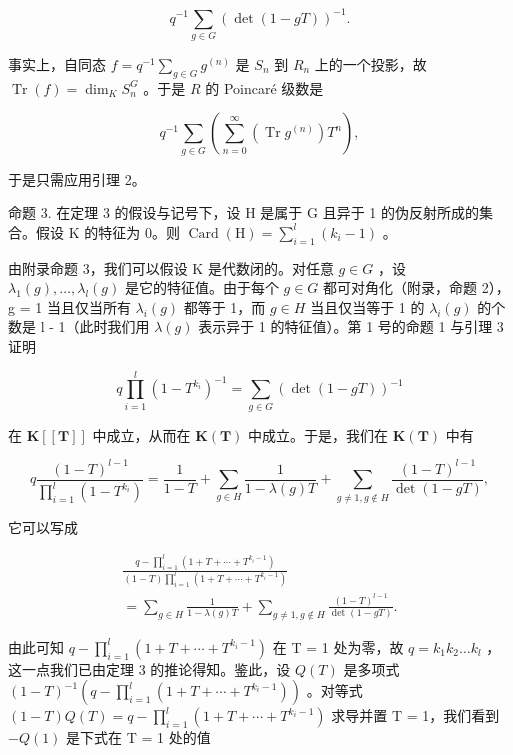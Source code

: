 \[
q ^ {- 1} \sum_ {g \in G} (\det (1 - g T)) ^ {- 1}.
\]

事实上，自同态 \(f = q^{-1} \sum_{g \in G} g^{(n)}\) 是 \(S_n\) 到 \(R_n\) 上的一个投影，故 \(\operatorname{Tr}(f) = \dim_K S_n^G\) 。于是 \(R\) 的 Poincaré 级数是

\[
q ^ {- 1} \sum_ {g \in G} \left(\sum_ {n = 0} ^ {\infty} (\operatorname{Tr} g ^ {(n)}) T ^ {n}\right),
\]

于是只需应用引理 2。

命题 3. 在定理 3 的假设与记号下，设 H 是属于 G 且异于 1 的伪反射所成的集合。假设 K 的特征为 0。则 \(\operatorname{Card}(\mathrm{H}) = \sum_{i=1}^{l}(k_i - 1)\) 。

由附录命题 3，我们可以假设 K 是代数闭的。对任意 \(g \in G\) ，设 \(\lambda_{1}(g), \ldots, \lambda_{l}(g)\) 是它的特征值。由于每个 \(g \in G\) 都可对角化（附录，命题 2），g = 1 当且仅当所有 \(\lambda_{i}(g)\) 都等于 1，而 \(g \in H\) 当且仅当等于 1 的 \(\lambda_{i}(g)\) 的个数是 l - 1（此时我们用 \(\lambda(g)\) 表示异于 1 的特征值）。第 1 号的命题 1 与引理 3 证明

\[
q \prod_ {i = 1} ^ {l} (1 - T ^ {k _ {i}}) ^ {- 1} = \sum_ {g \in G} (\det (1 - g T)) ^ {- 1}\tag{16}
\]

在 \(\mathbf{K}[[\mathbf{T}]]\) 中成立，从而在 \(\mathbf{K}(\mathbf{T})\) 中成立。于是，我们在 \(\mathbf{K}(\mathbf{T})\) 中有

\[
q \frac {(1 - T) ^ {l - 1}}{\prod_ {i = 1} ^ {l} (1 - T ^ {k _ {i}})} = \frac {1}{1 - T} + \sum_ {g \in H} \frac {1}{1 - \lambda (g) T} + \sum_ {g \neq 1, g \notin H} \frac {(1 - T) ^ {l - 1}}{\det (1 - g T)},
\]

它可以写成

\[
\begin{array}{c} \frac {q - \prod_ {i = 1} ^ {l} (1 + T + \cdots + T ^ {k _ {i} - 1})}{(1 - T) \prod_ {i = 1} ^ {l} (1 + T + \cdots + T ^ {k _ {i} - 1})} \\ = \sum_ {g \in H} \frac {1}{1 - \lambda (g) T} + \sum_ {g \neq 1, g \notin H} \frac {(1 - T) ^ {l - 1}}{\det (1 - g T)}. \end{array}\tag{17}
\]

由此可知 \(q - \prod_{i=1}^{l} (1 + T + \cdots + T^{k_i - 1})\) 在 T = 1 处为零，故 \(q = k_1 k_2 \ldots k_l\) ，这一点我们已由定理 3 的推论得知。鉴此，设 \(Q(T)\) 是多项式 \((1 - T)^{-1}(q - \prod_{i=1}^{l} (1 + T + \cdots + T^{k_i - 1}))\) 。对等式 \((1 - T)Q(T) = q - \prod_{i=1}^{l} (1 + T + \cdots + T^{k_i - 1})\) 求导并置 T = 1，我们看到 \(-Q(1)\) 是下式在 T = 1 处的值


